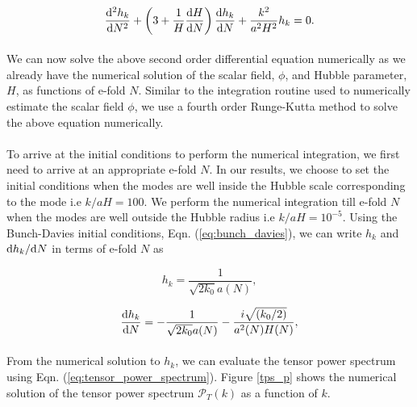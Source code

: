 \documentclass[12pt,a4paper,oneside]{book}
\begin{document}
\begin{equation}\label{eq:tensor_perturbations_ODE_N}
\frac{{\rm d}^2h_k}{{\rm d}N^2} +\left (3+\frac{1}{H}\frac{{\rm d}H}
{{\rm d}N}\right)\frac{{\rm d}h_k}{{\rm d}N} + \frac{k^2}{a^2H^2}h_k = 0.
\end{equation}

\paragraph*{} We can now solve the above second order differential equation numerically 
as we already have the numerical solution of the scalar field, $\phi$, and Hubble parameter, $H$, 
as functions of e-fold $N$. Similar to the integration routine used to numerically estimate the 
scalar field $\phi$, we use a fourth order Runge-Kutta method to solve the above equation numerically.

\paragraph*{} To arrive at the initial conditions to perform the numerical integration, we first need
to arrive at an appropriate e-fold $N$. In our results, we choose to set the initial conditions 
when the modes are well inside the Hubble scale corresponding to the mode i.e $k/aH = 100$. 
We perform the numerical integration till e-fold $N$ when the modes are well outside the 
Hubble radius i.e $k/aH = 10^{-5}$. Using the Bunch-Davies initial conditions, Eqn. (\ref{eq:bunch_davies}), 
we can write $h_k$ and ${\rm d}h_k/{\rm d}N$ in terms of e-fold $N$ as 

\begin{equation}\label{eq:h_k_init}
h_k  = \frac{1}{\sqrt{2k_0}a(N)},
\end{equation}

\begin{equation}\label{eq:Dh_k_init}
\frac{{\rm d}h_k}{{\rm d}N} = -\frac{1}{\sqrt{2k_0}a(N)} - \frac{i\sqrt{(k_0/2)}}{a^2(N)H(N)},
\end{equation}

\paragraph*{} From the numerical solution to $h_k$, we can evaluate the tensor power spectrum using Eqn. (\ref{eq:tensor_power_spectrum}).
Figure \ref{tps_p} shows the numerical solution of the tensor power spectrum $\mathcal{P}_T(k)$ as a function of $k$.
\end{document}
